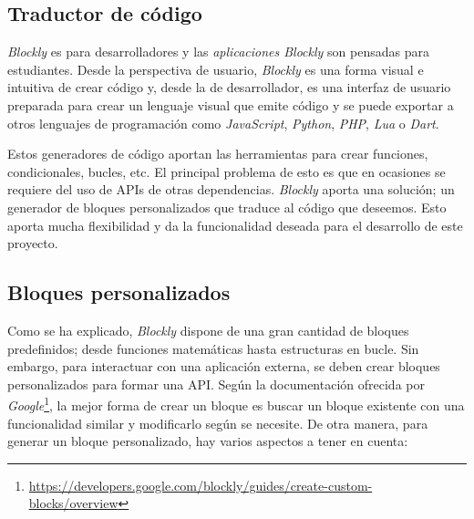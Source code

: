 \subsection{Traductor de código}
\textit{Blockly} es para desarrolladores y las \textit{aplicaciones Blockly} son pensadas para estudiantes. Desde la perspectiva de usuario, \textit{Blockly} es una forma visual e intuitiva de crear código y, desde la de desarrollador, es una interfaz de usuario preparada para crear un lenguaje visual que emite código y se puede exportar a otros lenguajes de programación como \textit{JavaScript}, \textit{Python}, \textit{PHP}, \textit{Lua} o \textit{Dart}. 

Estos generadores de código aportan las herramientas para crear funciones, condicionales, bucles, etc. El principal problema de esto es que en ocasiones se requiere del uso de APIs de otras dependencias. \textit{Blockly} aporta una solución; un generador de bloques personalizados que traduce al código que deseemos. Esto aporta mucha flexibilidad y da la funcionalidad deseada para el desarrollo de este proyecto. 

\subsection{Bloques personalizados}
Como se ha explicado, \textit{Blockly} dispone de una gran cantidad de bloques predefinidos; desde funciones matemáticas hasta estructuras en bucle. Sin embargo, para interactuar con una aplicación externa, se deben crear bloques personalizados para formar una API. Según la documentación ofrecida por \textit{Google}\footnote{\url{https://developers.google.com/blockly/guides/create-custom-blocks/overview}}, la mejor forma de crear un bloque es buscar un bloque existente con una funcionalidad similar y modificarlo según se necesite. De otra manera, para generar un bloque personalizado, hay varios aspectos a tener en cuenta: 

